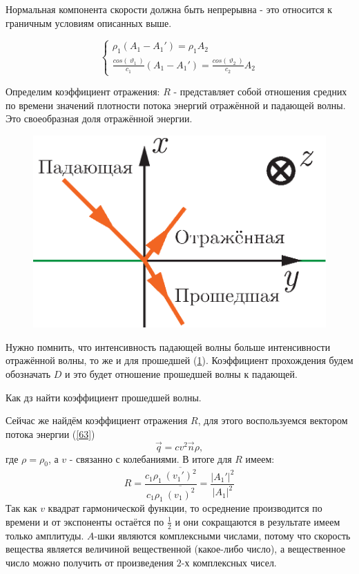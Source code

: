 \documentclass[14pt,a4paper,oneside]{extarticle}	%
\newcommand{\bracket}[1] {\left( #1 \right) } %
\begin{document}
Нормальная компонента скорости должна быть непрерывна - это относится к граничным условиям описанных выше.

\begin{equation*}
\begin{cases}
\rho_{1}\bracket{A_{1}-A_{1}'} = \rho_{1} A_{2} \\
\frac{cos(\:\vartheta_{1}\:)}{c_{1}}\bracket{A_{1}-A_{1}'}= \frac{cos(\:\vartheta_{2}\:)}{c_{2}}A_{2}
\end{cases}
\end{equation*} 

Определим коэффициент отражения:
$ R $ - представляет собой отношения средних по времени значений плотности потока энергий отражённой и падающей волны.
Это своеобразная доля отражённой энергии. 

\begin{figure}[h!] 	%
	\centering 		%
	\includegraphics[width=12cm]{6.eps} %
	\label{fig::6}
\end{figure}
Нужно помнить, что интенсивность падающей волны больше интенсивности отражённой волны, то же и для прошедшей (\ref{fig::6}).
Коэффициент прохождения будем обозначать $ D $ и это будет отношение прошедшей волны к падающей.

Как дз найти коэффициент прошедшей волны.

Сейчас же найдём коэффициент отражения $ R $, для этого воспользуемся вектором потока энергии (\ref{63})
\begin{equation*}
\vec{q} = cv^{2}\vec{n}\rho,
\end{equation*}
где $ \rho = \rho_{0} $, а $ v $ - связанно с колебаниями.
В итоге для $ R $ имеем:
\begin{equation*}
R = \frac{c_{1}\rho_{1}\:\overline{(v_{1}')^{2}}}{c_{1}\rho_{1}\:\overline{(v_{1})^{2}}} = \frac{|A_{1}'|^{2}}{|A_{1}|^{2}}
\end{equation*}
Так как $ v $ квадрат гармонической функции, то осреднение производится по времени и от экспоненты остаётся по $ \frac{1}{2} $ и они сокращаются в результате имеем только амплитуды.
$ A $-шки являются комплексными числами, потому что скорость вещества является величиной вещественной (какое-либо число), а вещественное число можно получить от произведения $ 2 $-х комплексных чисел. 
\end{document}
